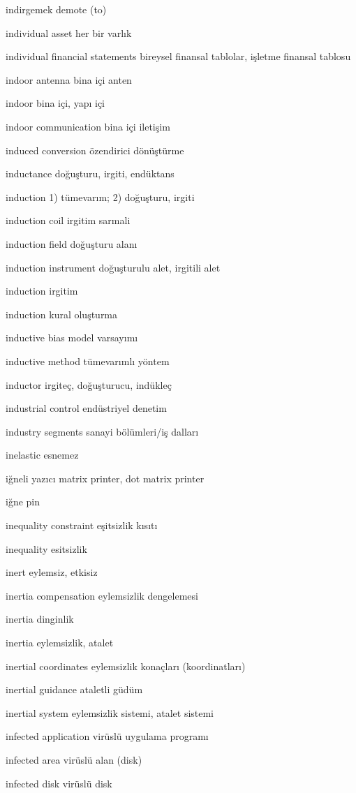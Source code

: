 \documentclass[12pt,fleqn]{article}\usepackage{../../common}
\begin{document}
indirgemek demote (to)

individual asset her bir varlık

individual financial statements bireysel finansal tablolar, işletme finansal tablosu

indoor antenna bina içi anten

indoor bina içi, yapı içi

indoor communication bina içi iletişim

induced conversion özendirici dönüştürme

inductance doğuşturu, irgiti, endüktans

induction 1) tümevarım; 2) doğuşturu, irgiti

induction coil irgitim sarmali

induction field doğuşturu alanı

induction instrument doğuşturulu alet, irgitili alet

induction irgitim

induction kural oluşturma

inductive bias model varsayımı

inductive method tümevarımlı yöntem

inductor irgiteç, doğuşturucu, indükleç

industrial control endüstriyel denetim

industry segments sanayi bölümleri/iş dalları

inelastic esnemez

iğneli yazıcı matrix printer, dot matrix printer

iğne pin

inequality constraint eşitsizlik kısıtı

inequality esitsizlik

inert eylemsiz, etkisiz

inertia compensation eylemsizlik dengelemesi

inertia dinginlik

inertia eylemsizlik, atalet

inertial coordinates eylemsizlik konaçları (koordinatları)

inertial guidance ataletli güdüm

inertial system eylemsizlik sistemi, atalet sistemi

infected application virüslü uygulama programı

infected area virüslü alan (disk)

infected disk virüslü disk
\end{document}
